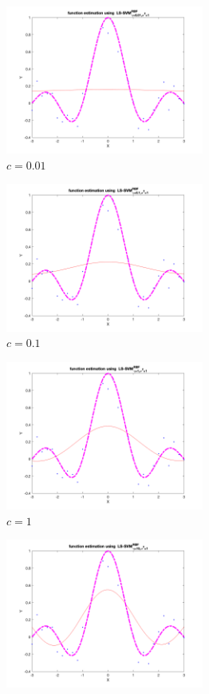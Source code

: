 \documentclass[a4paper, 11pt, one column]{article}
\begin{document}
\begin{figure}[H]
    \centering
        \begin{subfigure}{0.33\linewidth}
            \includegraphics[width=6.5cm]{images/sig1_gamma_0.01.png}
            \caption{$c=0.01$}
        \end{subfigure}\hfil
        \begin{subfigure}{0.33\linewidth}
            \includegraphics[width=6.5cm]{images/sig1_gamma_0.1.png}
            \caption{$c=0.1$}
        \end{subfigure}\hfil
        \begin{subfigure}{0.33\linewidth}
            \includegraphics[width=6.5cm]{images/sig1_gamma_1.png}
            \caption{$c=1$}
        \end{subfigure}\hfil
        \begin{subfigure}{0.33\linewidth}
            \includegraphics[width=6.5cm]{images/sig1_gamma_10.png}

\end{subfigure}
\end{figure}
\end{document}
